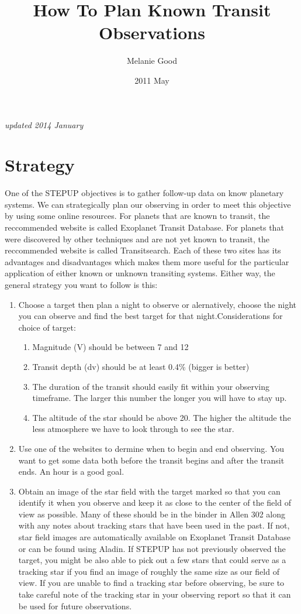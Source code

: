 \documentclass[12pt, preprint]{aastex}
\begin{document}
\title{How To Plan Known Transit Observations}
\author{Melanie Good}
\date{2011 May}
\emph{updated 2014 January}

\section{Strategy}

One of the STEPUP objectives is to gather follow-up data on know planetary systems. We can strategically plan our observing in order to meet this objective by using some online resources. For planets that are known to transit, the reccommended website is called Exoplanet Transit Database.  For planets that were discovered by other techniques and are not yet known to transit, the reccommended website is called Transitsearch.  Each of these two sites has its advantages and disadvantages which makes them more useful for the particular application of either known or unknown transiting systems.  Either way, the general strategy you want to follow is this:

\begin{enumerate}
\item Choose a target then plan a night to observe or alernatively, choose the night you can observe and find the best target for that night.Considerations for choice of target:

\begin{enumerate}
\item Magnitude (V) should be between 7 and 12
\item Transit depth (dv) should be at least 0.4\% (bigger is better)
\item The duration of the transit should easily fit within your observing timeframe. The larger this number the longer you will have to stay up.
\item The altitude of the star should be above 20\textdegree. The higher the altitude the less atmosphere we have to look through to see the star.
\end{enumerate}

\item Use one of the websites to dermine when to begin and end observing.  You want to get some data both before the transit begins and after the transit ends. An hour is a good goal.

\item Obtain an image of the star field with the target marked so that you can identify it when you observe and keep it as close to the center of the field of view as possible. Many of these should be in the binder in Allen 302 along with any notes about tracking stars that have been used in the past.  If not, star field images are automatically available on Exoplanet Transit Database or can be found using Aladin. If STEPUP has not previously observed the target, you might be also able to pick out a few stars that could serve as a tracking star if you find an image of roughly the same size as our field of view.  If you are unable to find a tracking star before observing, be sure to take careful note of the tracking star in your observing report so that it can be used for future observations.
\end{enumerate}
\end{document}
